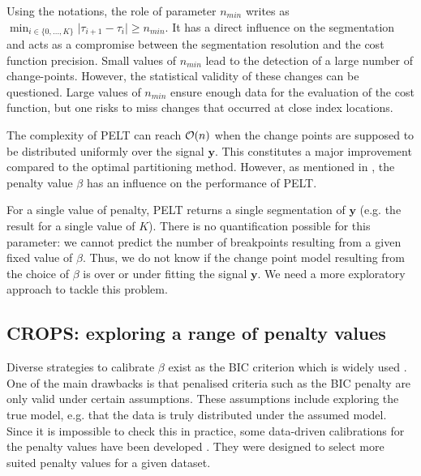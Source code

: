 Using the notations, the role of parameter $n_{min}$ writes as $\min_{i \in \{0,\dots,K\}}\lvert\tau_{i+1}-\tau_{i}\rvert \geq n_{min}$. It has a direct influence on the segmentation and acts as a compromise between the segmentation resolution and the cost function precision. Small values of $n_{min}$ lead to the detection of a large number of change-points. However, the statistical validity of these changes can be questioned. Large values of $n_{min}$ ensure enough data for the evaluation of the cost function, but one risks to miss changes that occurred at close index locations.  
  
The complexity of PELT can reach ${\mathcal O}(n)$ when the change points are supposed to be distributed uniformly over the signal $\bm y$. This constitutes a major improvement compared to the optimal partitioning method. However, as mentioned in \cite{Haynes2016}, the penalty value $\beta$ has an influence on the performance of PELT. 

For a single value of penalty, PELT returns a single segmentation of $\bm y$ (e.g. the result for a single value of $K$). There is no quantification possible for this parameter: we cannot predict the number of breakpoints resulting from a given fixed value of $\beta$. Thus, we do not know if the change point model resulting from the choice of $\beta$ is over or under fitting the signal $\bm y$. We need a more exploratory approach to tackle this problem.   

\subsection{CROPS: exploring a range of penalty values}

Diverse strategies to calibrate $\beta$ exist as the BIC criterion which is widely used \citep{YAO1988181,faure2016comparison,Shi2022}. 
One of the main drawbacks is that penalised criteria such as the BIC penalty are only valid under certain assumptions. These assumptions include exploring the true model, e.g. that the data is truly distributed under the assumed model. Since it is impossible to check this in practice, some data-driven calibrations for the penalty values have been developed \citep{Birge2006,Baudry2011,Bardet2012,arlot2009data}. They were designed to select more suited penalty values for a given dataset.  

